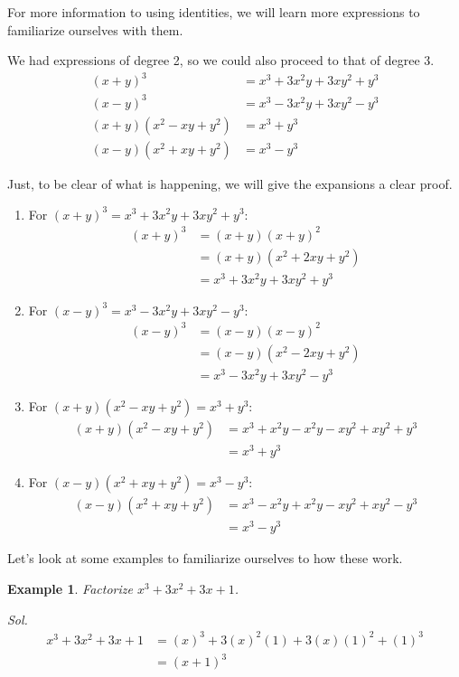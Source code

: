 \documentclass[12pt]{article}
\newtheorem{example}{Example}
\begin{document}
    For more information to using identities, we will learn more expressions to familiarize ourselves with them.

    We had expressions of degree 2, so we could also proceed to that of degree 3.\begin{align*}
        (x+y)^3&=x^3+3x^2y+3xy^2+y^3\\
        (x-y)^3&=x^3-3x^2y+3xy^2-y^3\\
        (x+y)(x^2-xy+y^2)&=x^3+y^3\\
        (x-y)(x^2+xy+y^2)&=x^3-y^3
    \end{align*}

    Just, to be clear of what is happening, we will give the expansions a clear proof.\begin{enumerate}
        \item For $(x+y)^3=x^3+3x^2y+3xy^2+y^3$:\begin{align*}
            (x+y)^3&=(x+y)(x+y)^2\\
            &=(x+y)(x^2+2xy+y^2)\\
            &=x^3+3x^2y+3xy^2+y^3
        \end{align*}
        \item For $(x-y)^3=x^3-3x^2y+3xy^2-y^3$:\begin{align*}
            (x-y)^3&=(x-y)(x-y)^2\\
            &=(x-y)(x^2-2xy+y^2)\\
            &=x^3-3x^2y+3xy^2-y^3
        \end{align*}
        \item For $(x+y)(x^2-xy+y^2)=x^3+y^3$:\begin{align*}
            (x+y)(x^2-xy+y^2)&=x^3+x^2y-x^2y-xy^2+xy^2+y^3\\
            &=x^3+y^3
        \end{align*}
        \item For $(x-y)(x^2+xy+y^2)=x^3-y^3$:\begin{align*}
            (x-y)(x^2+xy+y^2)&=x^3-x^2y+x^2y-xy^2+xy^2-y^3\\
            &=x^3-y^3
        \end{align*}
    \end{enumerate}
    
    Let's look at some examples to familiarize ourselves to how these work.

    \begin{example}
        Factorize $x^3+3x^2+3x+1$.
    \end{example}
    \textit{ Sol. }\begin{align*}
        x^3+3x^2+3x+1&=(x)^3+3(x)^2(1)+3(x)(1)^2+(1)^3\\
        &=(x+1)^3
    \end{align*}
\end{document}
